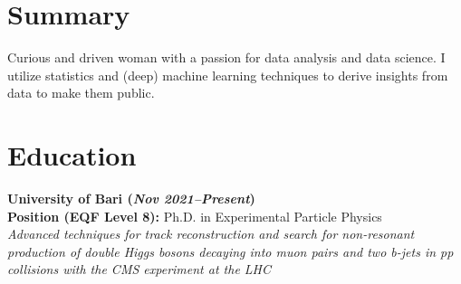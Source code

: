 \documentclass[11pt]{res}
\newcommand{\MarginText}[1]{\section{#1}\vspace{10pt}}
\begin{document}
\newcommand{\DOI}[1]{\href{https://doi.org/#1}{doi:#1}}
\begin{resume}
\MarginText{Summary}
Curious and driven woman with a passion for data analysis and data science. I utilize statistics and (deep) machine learning techniques to derive insights from data to make them public. 


\MarginText{Education}

\textbf{University of Bari (\textit{Nov 2021--Present})}\\
\textbf{Position (EQF Level 8):} Ph.D. in Experimental Particle Physics\\
\textit{Advanced techniques for track reconstruction and search for non-resonant production of double Higgs bosons decaying into muon pairs and two b-jets in pp collisions with the CMS experiment at the LHC}\\


\end{resume}
\end{document}

